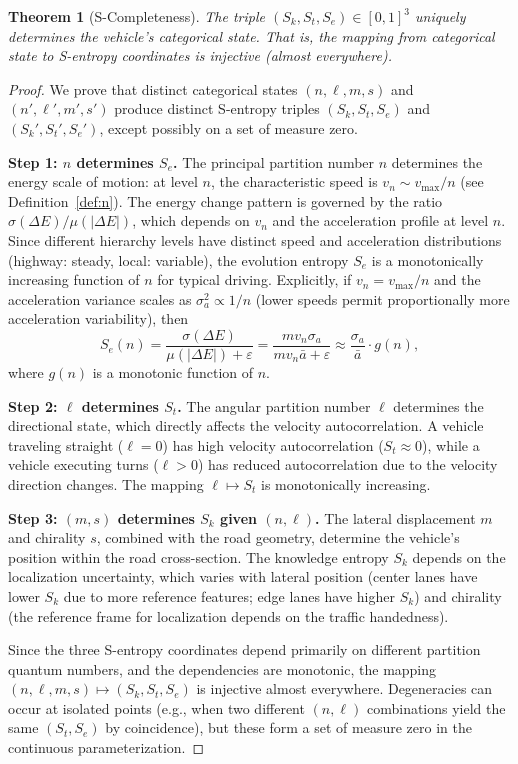 \documentclass[twocolumn,10pt]{article}
\newtheorem{theorem}{Theorem}[section]
\newcommand{\Sk}{S_k}
\newcommand{\St}{S_t}
\newcommand{\Se}{S_e}
\newcommand{\vmax}{v_{\mathrm{max}}}
\begin{document}
\begin{theorem}[S-Completeness]\label{thm:completeness}
The triple $(\Sk, \St, \Se) \in [0,1]^3$ uniquely determines the vehicle's categorical state. That is, the mapping from categorical state to S-entropy coordinates is injective (almost everywhere).
\end{theorem}

\begin{proof}
We prove that distinct categorical states $(n, \ell, m, s)$ and $(n', \ell', m', s')$ produce distinct S-entropy triples $(\Sk, \St, \Se)$ and $(\Sk', \St', \Se')$, except possibly on a set of measure zero.

\textbf{Step 1: $n$ determines $\Se$.} The principal partition number $n$ determines the energy scale of motion: at level $n$, the characteristic speed is $v_n \sim \vmax / n$ (see Definition~\ref{def:n}). The energy change pattern is governed by the ratio $\sigma(\Delta E)/\mu(|\Delta E|)$, which depends on $v_n$ and the acceleration profile at level $n$. Since different hierarchy levels have distinct speed and acceleration distributions (highway: steady, local: variable), the evolution entropy $\Se$ is a monotonically increasing function of $n$ for typical driving. Explicitly, if $v_n = \vmax / n$ and the acceleration variance scales as $\sigma_a^2 \propto 1/n$ (lower speeds permit proportionally more acceleration variability), then
\begin{equation}
\Se(n) = \frac{\sigma(\Delta E)}{\mu(|\Delta E|) + \varepsilon} = \frac{m v_n \sigma_a}{m v_n \bar{a} + \varepsilon} \approx \frac{\sigma_a}{\bar{a}} \cdot g(n),
\end{equation}
where $g(n)$ is a monotonic function of $n$.

\textbf{Step 2: $\ell$ determines $\St$.} The angular partition number $\ell$ determines the directional state, which directly affects the velocity autocorrelation. A vehicle traveling straight ($\ell = 0$) has high velocity autocorrelation ($\St \approx 0$), while a vehicle executing turns ($\ell > 0$) has reduced autocorrelation due to the velocity direction changes. The mapping $\ell \mapsto \St$ is monotonically increasing.

\textbf{Step 3: $(m, s)$ determines $\Sk$ given $(n, \ell)$.} The lateral displacement $m$ and chirality $s$, combined with the road geometry, determine the vehicle's position within the road cross-section. The knowledge entropy $\Sk$ depends on the localization uncertainty, which varies with lateral position (center lanes have lower $\Sk$ due to more reference features; edge lanes have higher $\Sk$) and chirality (the reference frame for localization depends on the traffic handedness).

Since the three S-entropy coordinates depend primarily on different partition quantum numbers, and the dependencies are monotonic, the mapping $(n, \ell, m, s) \mapsto (\Sk, \St, \Se)$ is injective almost everywhere. Degeneracies can occur at isolated points (e.g., when two different $(n, \ell)$ combinations yield the same $(\St, \Se)$ by coincidence), but these form a set of measure zero in the continuous parameterization.
\end{proof}
\end{document}
